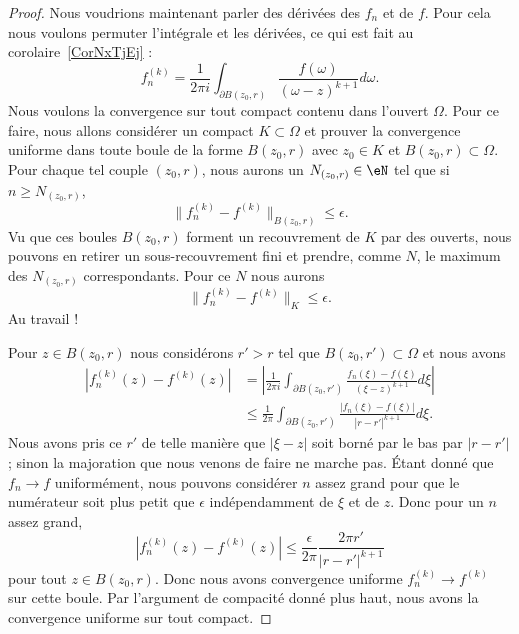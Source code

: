 \begin{proof}
	Nous voudrions maintenant parler des dérivées des \( f_n\) et de \( f\). Pour cela nous voulons permuter l'intégrale et les dérivées, ce qui est fait au corolaire~\ref{CorNxTjEj} :
	\begin{equation}
		f_n^{(k)}=\frac{1}{ 2\pi i }\int_{\partial B(z_0,r)}\frac{ f(\omega) }{ (\omega-z)^{k+1} }d\omega.
	\end{equation}
	Nous voulons la convergence sur tout compact contenu dans l'ouvert \( \Omega\). Pour ce faire, nous allons considérer un compact \( K\subset \Omega\) et prouver la convergence uniforme dans toute boule de la forme \( B(z_0,r)\) avec \( z_0\in K\) et \( B(z_0,r)\subset \Omega\). Pour chaque tel couple \( (z_0,r)\), nous aurons un \( N_{(z_0,r)}\in \eN\) tel que si \( n\geq N_{(z_0,r)}\),
	\begin{equation}
		\| f_n^{(k)}-f^{(k)} \|_{B(z_0,r)}\leq \epsilon.
	\end{equation}
	Vu que ces boules \( B(z_0,r)\) forment un recouvrement de \( K\) par des ouverts, nous pouvons en retirer un sous-recouvrement fini et prendre, comme \( N\), le maximum des \( N_{(z_0,r)}\) correspondants. Pour ce \( N\) nous aurons
	\begin{equation}
		\| f_n^{(k)}-f^{(k)} \|_K\leq \epsilon.
	\end{equation}
	Au travail !

	Pour \( z\in B(z_0,r)\) nous considérons \( r'>r\) tel que \( B(z_0,r')\subset \Omega\) et nous avons
	\begin{subequations}
		\begin{align}
			| f^{(k)}_n(z)-f^{(k)}(z) | & =\left| \frac{1}{ 2\pi i }\int_{\partial B(z_0,r')}\frac{ f_n(\xi)-f(\xi) }{ (\xi-z)^{k+1} }d\xi \right| \\
			                            & \leq\frac{1}{ 2\pi }\int_{\partial B(z_0,r')}\frac{ | f_n(\xi)-f(\xi) | }{ | r-r' |^{k+1} }d\xi.
		\end{align}
	\end{subequations}
	Nous avons pris ce \( r'\) de telle manière que \( | \xi-z |\) soit borné par le bas par \( | r-r' |\); sinon la majoration que nous venons de faire ne marche pas. Étant donné que \( f_n\to f\) uniformément, nous pouvons considérer \( n\) assez grand pour que le numérateur soit plus petit que \( \epsilon\) indépendamment de \( \xi\) et de \( z\). Donc pour un \( n\) assez grand,
	\begin{equation}
		| f^{(k)}_n(z)-f^{(k)}(z) |\leq \frac{ \epsilon }{ 2\pi }\frac{ 2\pi r' }{ | r-r' |^{k+1} }
	\end{equation}
	pour tout \( z\in B(z_0,r)\). Donc nous avons convergence uniforme \( f_n^{(k)}\to f^{(k)}\) sur cette boule. Par l'argument de compacité donné plus haut, nous avons la convergence uniforme sur tout compact.
\end{proof}
